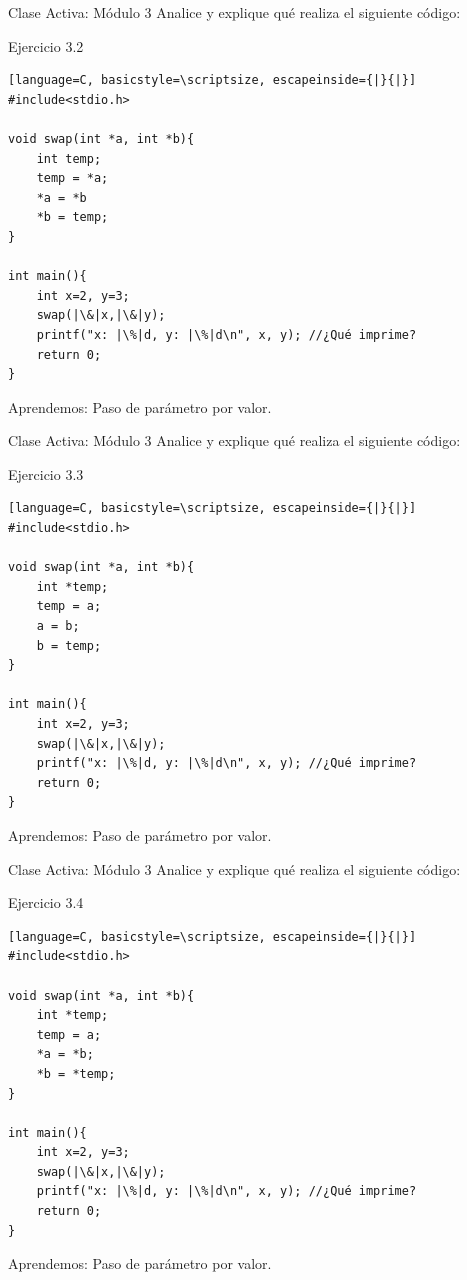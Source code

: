 \documentclass{beamer}
\begin{document}
\begin{frame}[fragile]{Clase Activa: Módulo 3}
Analice y explique qué realiza el siguiente código:
\begin{exampleblock}{Ejercicio 3.2}
\begin{lstlisting}[language=C, basicstyle=\scriptsize, escapeinside={|}{|}]
#include<stdio.h>

void swap(int *a, int *b){ 
	int temp;
	temp = *a; 
	*a = *b
	*b = temp;
}

int main(){
	int x=2, y=3;
	swap(|\&|x,|\&|y);
	printf("x: |\%|d, y: |\%|d\n", x, y); //¿Qué imprime?
	return 0;
}
\end{lstlisting}
\end{exampleblock}

{\tiny Aprendemos: Paso de parámetro por valor.}
\end{frame}


\begin{frame}[fragile]{Clase Activa: Módulo 3}
Analice y explique qué realiza el siguiente código:
\begin{exampleblock}{Ejercicio 3.3}
\begin{lstlisting}[language=C, basicstyle=\scriptsize, escapeinside={|}{|}]
#include<stdio.h>

void swap(int *a, int *b){
	int *temp;
	temp = a; 
	a = b; 
	b = temp;
}

int main(){
	int x=2, y=3;
	swap(|\&|x,|\&|y);
	printf("x: |\%|d, y: |\%|d\n", x, y); //¿Qué imprime?
	return 0;
}
\end{lstlisting}
\end{exampleblock}

{\tiny Aprendemos: Paso de parámetro por valor.}
\end{frame}

\begin{frame}[fragile]{Clase Activa: Módulo 3}
Analice y explique qué realiza el siguiente código:
\begin{exampleblock}{Ejercicio 3.4}
\begin{lstlisting}[language=C, basicstyle=\scriptsize, escapeinside={|}{|}]
#include<stdio.h>

void swap(int *a, int *b){
	int *temp;
	temp = a; 
	*a = *b; 
	*b = *temp;
}

int main(){
	int x=2, y=3;
	swap(|\&|x,|\&|y);
	printf("x: |\%|d, y: |\%|d\n", x, y); //¿Qué imprime?
	return 0;
}
\end{lstlisting}
\end{exampleblock}

{\tiny Aprendemos: Paso de parámetro por valor.}
\end{frame}
\end{document}
